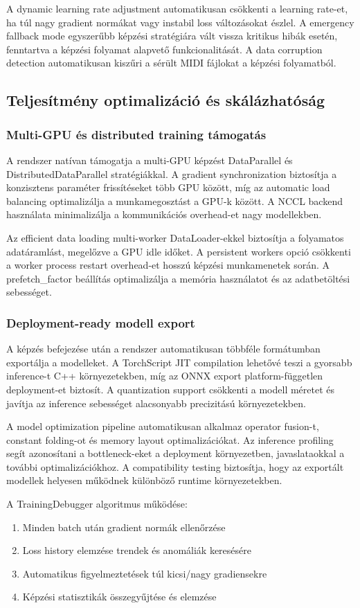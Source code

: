 A dynamic learning rate adjustment automatikusan csökkenti a learning rate-et, ha túl nagy gradient normákat vagy instabil loss változásokat észlel. A emergency fallback mode egyszerűbb képzési stratégiára vált vissza kritikus hibák esetén, fenntartva a képzési folyamat alapvető funkcionalitását. A data corruption detection automatikusan kiszűri a sérült MIDI fájlokat a képzési folyamatból.

\subsection{Teljesítmény optimalizáció és skálázhatóság}

\subsubsection{Multi-GPU és distributed training támogatás}
A rendszer natívan támogatja a multi-GPU képzést DataParallel és DistributedDataParallel stratégiákkal. A gradient synchronization biztosítja a konzisztens paraméter frissítéseket több GPU között, míg az automatic load balancing optimalizálja a munkamegosztást a GPU-k között. A NCCL backend használata minimalizálja a kommunikációs overhead-et nagy modellekben.

Az efficient data loading multi-worker DataLoader-ekkel biztosítja a folyamatos adatáramlást, megelőzve a GPU idle időket. A persistent workers opció csökkenti a worker process restart overhead-et hosszú képzési munkamenetek során. A prefetch_factor beállítás optimalizálja a memória használatot és az adatbetöltési sebességet.

\subsubsection{Deployment-ready modell export}
A képzés befejezése után a rendszer automatikusan többféle formátumban exportálja a modelleket. A TorchScript JIT compilation lehetővé teszi a gyorsabb inference-t C++ környezetekben, míg az ONNX export platform-független deployment-et biztosít. A quantization support csökkenti a modell méretet és javítja az inference sebességet alacsonyabb precizitású környezetekben.

A model optimization pipeline automatikusan alkalmaz operator fusion-t, constant folding-ot és memory layout optimalizációkat. Az inference profiling segít azonosítani a bottleneck-eket a deployment környezetben, javaslataokkal a további optimalizációkhoz. A compatibility testing biztosítja, hogy az exportált modellek helyesen működnek különböző runtime környezetekben.

A TrainingDebugger algoritmus működése:
\begin{enumerate}
\item Minden batch után gradient normák ellenőrzése
\item Loss history elemzése trendek és anomáliák keresésére  
\item Automatikus figyelmeztetések túl kicsi/nagy gradiensekre
\item Képzési statisztikák összegyűjtése és elemzése
\end{enumerate}